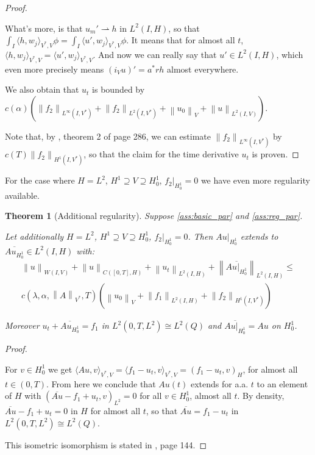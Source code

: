 \documentclass[english,a4paper,10pt,oneside]{scrbook}	%
\theoremstyle{break}
\newtheorem{thm}[equation]{Theorem}
\newenvironment{mproof}[1][\proofname]{%
  \begin{proof}[#1]$ $\par\nobreak\ignorespaces
}{%
  \end{proof}
}
\renewcommand*{\proofname}{Proof}
\theoremstyle{remark}
\newcommand{\norm}[1]{\left\lVert#1\right\rVert}
\newcommand{\VN}[1]{\norm{#1}_{V}}
\newcommand{\VSN}[1]{\norm{#1}_{V^*}}
\begin{document}
\begin{mproof}
What's more, is that $u_m' \rightharpoonup h$ in $L^2(I,H)$, so that $\int_I \langle h ,w_j\rangle_{V^*,V}\phi = \int_I \langle u',w_j\rangle_{V^*,V}\phi$. It means that for almost all $t$, $\langle h ,w_j\rangle_{V^*,V} = \langle u',w_j\rangle_{V^*,V}$. And now we can really say that $u' \in L^2(I,H)$, which even more precisely means $(i_Vu)' = a^* r h$ almost everywhere.

We also obtain that $u_t$ is bounded by $c(\alpha)(\norm{f_2}_{L^\infty(I,V^*)}+\norm{f_2}_{L^2(I,V^*)}+\VN{u_0}+\norm{u}_{L^2(I,V)})$.

Note that, by \cite{evans}, theorem 2 of page 286, we can estimate $\norm{f_2}_{L^\infty(I,V^*)}$ by $c(T)\norm{f_2}_{H^1(I,V^*)}$, so that the claim for the time derivative $u_t$ is proven.

\end{mproof}

For the case where $H=L^2$, $H^1\supseteq V\supseteq H^1_0$,  $f_2|_{H^1_0}=0$ we have even more regularity available.

\begin{thm}[Additional regularity]
\label{thm:par_reg}
Suppose \cref{ass:basic_par} and \cref{ass:reg_par}. 

Let additionally $H=L^2$, $H^1\supseteq V\supseteq H^1_0$,  $f_2|_{H^1_0}=0$. Then $Au|_{H^1_0}$ extends to $\overline{Au_{H^1_0}} \in L^2(I,H)$ with:
\begin{align}
	\norm{u}_{W(I,V)} + \norm{u}_{C([0,T],H)} + \norm{u_t}_{L^2(I,H)} +\norm{\overline{Au|_{H^1_0}}}_{L^2(I,H)}\leq\\ c(\lambda, \alpha, \VSN{A}, T)(\VN{u_0}+\norm{f_1}_{L^2(I,H)} + \norm{f_2}_{H^1(I,V^*)})
\end{align}

Moreover $u_t+\overline{Au_{H^1_0}}=f_1$ in $L^2(0,T,L^2)\cong L^2(Q)$ and $\overline{Au|_{H^1_0}}=Au$ on $H^1_0$.

\end{thm}
\begin{mproof}

For $v \in H^1_0$ we get $ \langle Au,v \rangle_{V^*,V} =  \langle f_1-u_t,v \rangle_{V^*,V} = ( f_1-u_t,v )_H$, for almost all $t \in (0,T)$. From here we conclude that $Au(t)$ extends for a.a. $t$ to an element of $H$ with $(\overline{Au}-f_1+u_t,v)_{L^2}=0$ for all $v \in H^1_0$, almost all $t$. By density, $\overline{Au}-f_1+u_t=0$ in $H$ for almost all $t$, so that $\overline{Au}=f_1-u_t$ in $L^2(0,T,L^2)\cong L^2(Q)$.

This isometric isomorphism is stated in \cite{trol}, page 144. 

\end{mproof}
\end{document}
